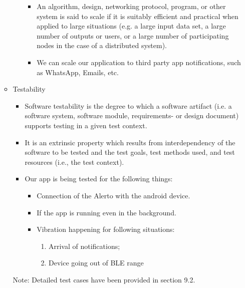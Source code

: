 \documentclass[12pt,a4paper]{report}
\begin{document}
\begin{itemize}
\begin{itemize}
\begin{itemize}
			\begin{itemize}
				\item An algorithm, design, networking protocol, program, or other system is said to scale if it is suitably efficient and practical when applied to large situations (e.g. a large input data set, a large number of outputs or users, or a large number of participating nodes in the case of a distributed system).
				\item We can scale our application to third party app notifications, such as WhatsApp, Emails, etc.
			\end{itemize}
		\end{itemize}
		\item Testability
		\begin{itemize}
			\item Software testability is the degree to which a software artifact (i.e. a software system, software module, requirements- or design document) supports testing in a given test context.
			\item It is an extrinsic property which results from interdependency of the software to be tested and the test goals, test methods used, and test resources (i.e., the test context).
			\item Our app is being tested for the following things:
			\begin{itemize}
				\item Connection of the Alerto with the android device.
				\item If the app is running even in the background.
				\item Vibration happening for following situations:
				\begin{enumerate}
					 	\item Arrival of notifications;
					 	\item Device going out of BLE range
					 	
				\end{enumerate}
				
			\end{itemize}
			
		\end{itemize}
		Note:  Detailed test cases have been provided in section 9.2.
		

\end{itemize}
\end{itemize}
\end{document}
